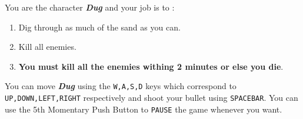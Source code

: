   You are the character \textbf{\textit{Dug}} and your job is to :

  \begin{enumerate}
    \item Dig through as much of the sand as you can.
    \item Kill all enemies.
    \item \textbf{You must kill all the enemies withing 2 minutes or else you die}.
  \end{enumerate}

  You can move \textbf{\textit{Dug}} using the \texttt{W,A,S,D} keys which correspond to 
  \texttt{UP,DOWN,LEFT,RIGHT} respectively and shoot your bullet using \texttt{SPACEBAR}.
  You can use the 5th Momentary Push Button to \texttt{PAUSE} the game whenever you want.


